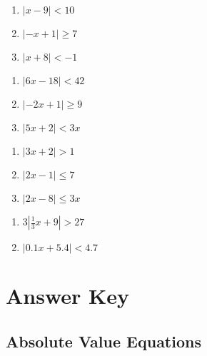 \begin{multicols}{3}
\begin{enumerate}
	\item $|x-9| < 10$
	\item $|-x+1| \geq 7$
	\item $|x+8| < -1$
\end{enumerate}	\setcounter{Review}{\value{enumi}}
\end{multicols}
\begin{multicols}{3}
\begin{enumerate}	\setcounter{enumi}{\value{Review}}
	\item $|6x - 18| < 42$
	\item $|-2x+1| \geq 9$
	\item $|5x + 2| < 3x$
\end{enumerate}	\setcounter{Review}{\value{enumi}}
\end{multicols}
\begin{multicols}{3}
\begin{enumerate}	\setcounter{enumi}{\value{Review}}
	\item $|3x + 2| > 1$
    \item $|2x - 1| \leq 7$ 
    \item $|2x-8| \leq 3x$
\end{enumerate}	\setcounter{Review}{\value{enumi}}
\end{multicols}
\begin{multicols}{3}
\begin{enumerate}	\setcounter{enumi}{\value{Review}}
	\item $3\left| \frac{1}{3}x+9\right| > 27$
	\item $|0.1x+5.4| < 4.7$
\end{enumerate}	\setcounter{Review}{\value{enumi}}
\end{multicols}


\newpage

\section{Answer Key}

\subsection*{Absolute Value Equations}

